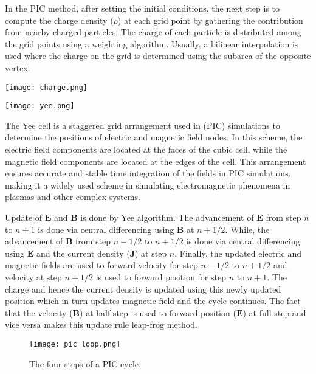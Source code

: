 \begin{minipage}{0.50\textwidth}\raggedright
    In the PIC method, after setting the initial conditions, the next step is to compute the charge density ($\rho$) at each grid point by gathering the contribution from nearby charged particles. The charge of each particle is distributed among the grid points using a weighting algorithm. Usually, a bilinear interpolation is used where the charge on the grid is determined using the subarea of the opposite vertex.
\end{minipage}
\begin{minipage}{0.45\textwidth}\raggedleft
    \texttt{[image: charge.png]}
\end{minipage}

\begin{minipage}{0.55\textwidth}\raggedright
    \texttt{[image: yee.png]}
\end{minipage}
\begin{minipage}{0.40\textwidth}\raggedright
    The Yee cell is a staggered grid arrangement used in (PIC) simulations to determine the positions of electric and magnetic field nodes. In this scheme, the electric field components are located at the faces of the cubic cell, while the magnetic field components are located at the edges of the cell. This arrangement ensures accurate and stable time integration of the fields in PIC simulations, making it a widely used scheme in simulating electromagnetic phenomena in plasmas and other complex systems.
\end{minipage}

Update of $\mathbf{E}$ and $\mathbf{B}$ is done by Yee algorithm. The advancement of $\mathbf{E}$ from step $n$ to $n+1$ is done via central differencing using $\mathbf{B}$ at $n+1/2$. While, the advancement of $\mathbf{B}$ from step $n-1/2$ to $n+1/2$ is done via central differencing using $\mathbf{E}$ and the current density ($\textbf{J}$) at step $n$. Finally, the updated electric and magnetic fields are used to forward velocity for step $n-1/2$ to $n+1/2$ and velocity at step $n+1/2$ is used to forward position for step $n$ to $n+1$. The charge and hence the current density is updated using this newly updated position which in turn updates magnetic field and the cycle continues. The fact that the velocity ($\mathbf{B}$) at half step is used to forward position ($\mathbf{E}$) at full step and vice versa makes this update rule leap-frog method.

\begin{figure}[H]
    \centering
    \texttt{[image: pic\_loop.png]}
    \caption{The four steps of a PIC cycle.}
    \label{fig:pic-loop}
\end{figure}


